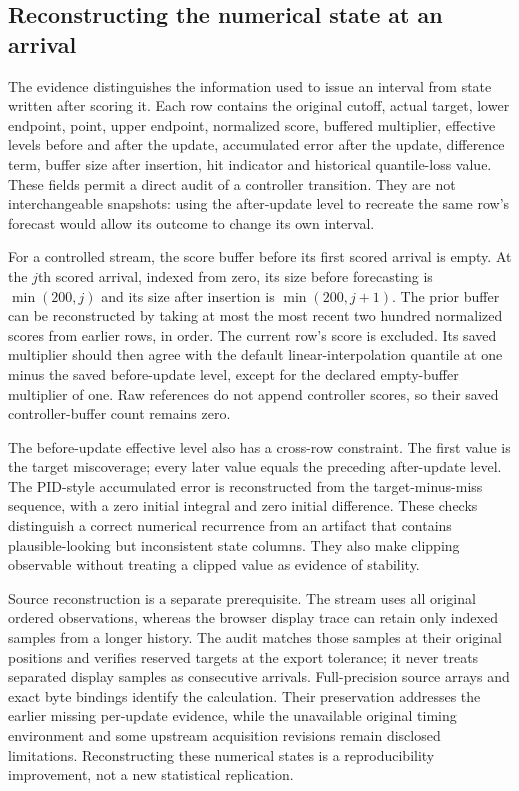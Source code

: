 \subsection{Reconstructing the numerical state at an arrival}
The evidence distinguishes the information used to issue an interval from state written after scoring it. Each row contains the original cutoff, actual target, lower endpoint, point, upper endpoint, normalized score, buffered multiplier, effective levels before and after the update, accumulated error after the update, difference term, buffer size after insertion, hit indicator and historical quantile-loss value. These fields permit a direct audit of a controller transition. They are not interchangeable snapshots: using the after-update level to recreate the same row's forecast would allow its outcome to change its own interval.

For a controlled stream, the score buffer before its first scored arrival is empty. At the $j$th scored arrival, indexed from zero, its size before forecasting is $\min(200,j)$ and its size after insertion is $\min(200,j+1)$. The prior buffer can be reconstructed by taking at most the most recent two hundred normalized scores from earlier rows, in order. The current row's score is excluded. Its saved multiplier should then agree with the default linear-interpolation quantile at one minus the saved before-update level, except for the declared empty-buffer multiplier of one. Raw references do not append controller scores, so their saved controller-buffer count remains zero.

The before-update effective level also has a cross-row constraint. The first value is the target miscoverage; every later value equals the preceding after-update level. The PID-style accumulated error is reconstructed from the target-minus-miss sequence, with a zero initial integral and zero initial difference. These checks distinguish a correct numerical recurrence from an artifact that contains plausible-looking but inconsistent state columns. They also make clipping observable without treating a clipped value as evidence of stability.

Source reconstruction is a separate prerequisite. The stream uses all original ordered observations, whereas the browser display trace can retain only indexed samples from a longer history. The audit matches those samples at their original positions and verifies reserved targets at the export tolerance; it never treats separated display samples as consecutive arrivals. Full-precision source arrays and exact byte bindings identify the calculation. Their preservation addresses the earlier missing per-update evidence, while the unavailable original timing environment and some upstream acquisition revisions remain disclosed limitations. Reconstructing these numerical states is a reproducibility improvement, not a new statistical replication.
